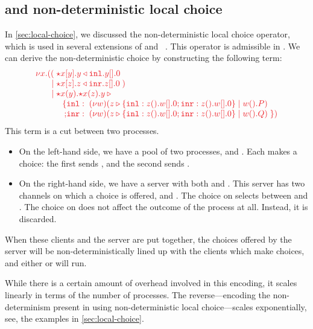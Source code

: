 \documentclass[envcountsame,envcountsect,UKenglish]{llncs}
\begin{document}
\subsection{\nodcap and non-deterministic local choice}\label{sec:nc-local-choice}
In \cref{sec:local-choice}, we discussed the non-deterministic local choice operator, which is used in several extensions of \piDILL and \cp~\parencite{atkey2016,caires2014,caires2017}. This operator is admissible in \nodcap. We can derive the non-deterministic choice  by constructing the following term:
\[%
  \arraycolsep=0pt
  \tm{
  \begin{array}{lrlrl}
    \nu x.&((  & \; \ncCnt{x}{y}{\cpInl{y}{\cpHalt{y}}} \\
          &\mid& \; \ncCnt{x}{z}{\cpInr{z}{\cpHalt{z}}} \; )\\
          &\mid& \; \ncSrv{x}{y}{\ncSrv{x}{z}{y\:{\triangleright}}}\\
          &    & \quad
                 \begin{array}{rl}
                   \{ & \texttt{inl}: \; \cpCut{w}{\cpCase{z}{\cpWait{z}{\cpHalt{w}}}{
                           \cpWait{z}{\cpHalt{w}}}}{\cpWait{w}{P}}
                   \\
                    ; & \texttt{inr}: \; \cpCut{w}{\cpCase{z}{\cpWait{z}{\cpHalt{w}}}{
                           \cpWait{z}{\cpHalt{w}}}}{\cpWait{w}{Q}} \; \})
                 \end{array}
  \end{array}
  }
\]
This term is a cut between two processes.
\begin{itemize}
\item
  On the left-hand side, we have a pool of two processes,  and . Each makes a choice: the first sends , and the second sends . 
\item
  On the right-hand side, we have a server with both  and . This server has two channels on which a choice is offered,  and . The choice on  selects between  and . The choice on  does not affect the outcome of the process at all. Instead, it is discarded.
\end{itemize}
When these clients and the server are put together, the choices offered by the server will be non-deterministically lined up with the clients which make choices, and either  or  will run.

While there is a certain amount of overhead involved in this encoding, it scales linearly in terms of the number of processes. The reverse---encoding the non-determinism present in \nodcap using non-deterministic local choice---scales exponentially, see, \eg the examples in \cref{sec:local-choice}.
\end{document}
